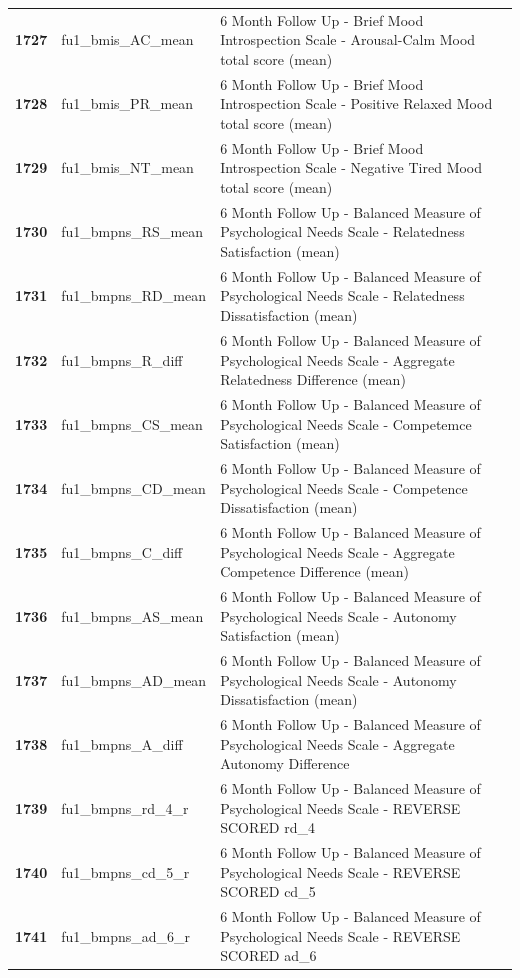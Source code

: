 \documentclass[
  letterpaper,
  DIV=11,
  numbers=noendperiod]{scrartcl}
\begin{document}
\begin{longtable}[t]{>{}cll}
\textbf{1727} & fu1\_bmis\_AC\_mean & 6 Month Follow Up - Brief Mood Introspection Scale - Arousal-Calm Mood total score (mean)\\
\textbf{1728} & fu1\_bmis\_PR\_mean & 6 Month Follow Up - Brief Mood Introspection Scale - Positive Relaxed Mood total score (mean)\\
\textbf{1729} & fu1\_bmis\_NT\_mean & 6 Month Follow Up - Brief Mood Introspection Scale - Negative Tired Mood total score (mean)\\
\textbf{1730} & fu1\_bmpns\_RS\_mean & 6 Month Follow Up - Balanced Measure of Psychological Needs Scale - Relatedness Satisfaction (mean)\\
\addlinespace
\textbf{1731} & fu1\_bmpns\_RD\_mean & 6 Month Follow Up - Balanced Measure of Psychological Needs Scale - Relatedness Dissatisfaction (mean)\\
\textbf{1732} & fu1\_bmpns\_R\_diff & 6 Month Follow Up - Balanced Measure of Psychological Needs Scale - Aggregate Relatedness Difference (mean)\\
\textbf{1733} & fu1\_bmpns\_CS\_mean & 6 Month Follow Up - Balanced Measure of Psychological Needs Scale - Competemce Satisfaction (mean)\\
\textbf{1734} & fu1\_bmpns\_CD\_mean & 6 Month Follow Up - Balanced Measure of Psychological Needs Scale - Competence Dissatisfaction (mean)\\
\textbf{1735} & fu1\_bmpns\_C\_diff & 6 Month Follow Up - Balanced Measure of Psychological Needs Scale - Aggregate Competence Difference (mean)\\
\addlinespace
\textbf{1736} & fu1\_bmpns\_AS\_mean & 6 Month Follow Up - Balanced Measure of Psychological Needs Scale - Autonomy Satisfaction (mean)\\
\textbf{1737} & fu1\_bmpns\_AD\_mean & 6 Month Follow Up - Balanced Measure of Psychological Needs Scale - Autonomy Dissatisfaction (mean)\\
\textbf{1738} & fu1\_bmpns\_A\_diff & 6 Month Follow Up - Balanced Measure of Psychological Needs Scale - Aggregate Autonomy Difference\\
\textbf{1739} & fu1\_bmpns\_rd\_4\_r & 6 Month Follow Up - Balanced Measure of Psychological Needs Scale - REVERSE SCORED rd\_4\\
\textbf{1740} & fu1\_bmpns\_cd\_5\_r & 6 Month Follow Up - Balanced Measure of Psychological Needs Scale - REVERSE SCORED cd\_5\\
\addlinespace
\textbf{1741} & fu1\_bmpns\_ad\_6\_r & 6 Month Follow Up - Balanced Measure of Psychological Needs Scale - REVERSE SCORED ad\_6\\

\end{longtable}
\end{document}

